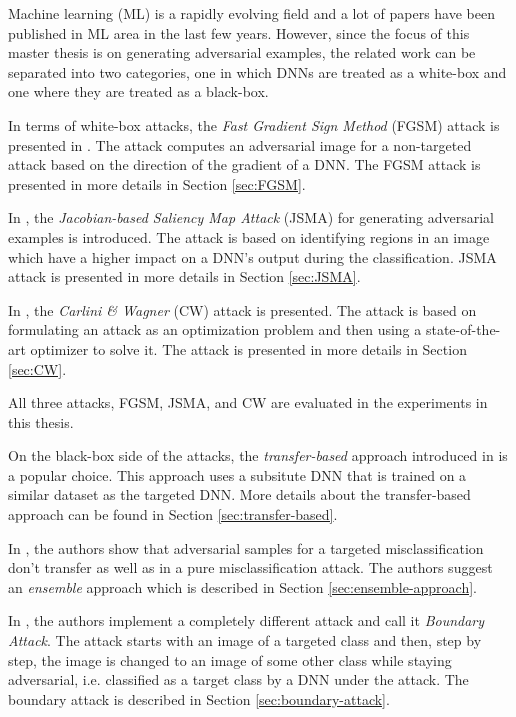 Machine learning (ML) is a rapidly evolving field and a lot of papers have been published in ML area in the last few years. However, since the focus of this master thesis is on generating adversarial examples, the related work can be separated into two categories, one in which DNNs are treated as a white-box and one where they are treated as a black-box. 

In terms of white-box attacks, the \textit{Fast Gradient Sign Method} (FGSM) attack is presented  in \cite{fgsm-original}. The attack computes an adversarial image for a non-targeted attack based on the direction of the gradient of a DNN. The FGSM attack is presented in more details in Section \ref{sec:FGSM}.

In \cite{DBLP:journals/corr/PapernotMJFCS15}, the \textit{Jacobian-based Saliency Map Attack} (JSMA) for generating adversarial examples is introduced. The attack is based on identifying regions in an image which have a higher impact on a DNN's output during the classification. JSMA attack is presented in more details in  Section \ref{sec:JSMA}.

In \cite{DBLP:journals/corr/CarliniW16a}, the \textit{Carlini \& Wagner} (CW) attack is presented. The attack is based on formulating an attack as an optimization problem and then using a state-of-the-art optimizer to solve it. The attack is presented in more details in Section \ref{sec:CW}.

All three attacks, FGSM, JSMA, and CW are evaluated in the experiments in this thesis.

On the black-box side of the attacks, the \textit{transfer-based} approach introduced in \cite{DBLP:journals/corr/PapernotMGJCS16} is a popular choice. This approach uses a subsitute DNN that is trained on a similar dataset as the targeted DNN. More details about the transfer-based approach can be found in Section \ref{sec:transfer-based}.

In \cite{ensemble-attack}, the authors show that adversarial samples for a targeted misclassification don't transfer as well as in a pure misclassification attack. The authors suggest an \textit{ensemble} approach which is described in Section \ref{sec:ensemble-approach}.

In \cite{brendel2018decisionbased}, the authors implement a completely different attack and call it \textit{Boundary Attack}. The attack starts with an image of a targeted class and then, step by step, the image is changed to an image of some other class while staying adversarial, i.e. classified as a target class by a DNN under the attack. The boundary attack is described in Section \ref{sec:boundary-attack}.

